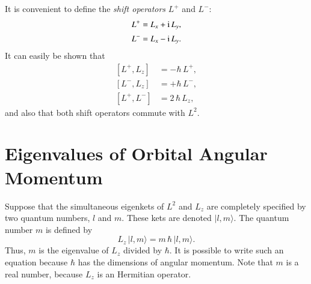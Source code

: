 It is convenient to define the {\em shift operators}\/ $L^+$ and $L^-$:
\begin{align}
L^+ &= L_x + {\rm i}\, L_y,\\[0.5ex]
L^- &= L_x -{\rm i} \,L_y.
\end{align}
It can easily be shown that
\begin{align}\label{e5.13a}
[L^+, L_z ] &= -\hbar\,L^+,\\[0.5ex]
[L^-, L_z] &=+\hbar\,L^-,\\[0.5ex]
[L^+, L^-] &= 2\,\hbar\,L_z,
\end{align}
and also that both  shift operators commute with $L^2$. 

\section{Eigenvalues of Orbital Angular Momentum}\label{s5.2}
Suppose that the simultaneous eigenkets of $L^2$ and $L_z$ are completely
specified by two quantum numbers, $l$ and $m$. These  kets are denoted
$|l, m\rangle$. The quantum number $m$ is defined by
\begin{equation}
L_z \,|l, m\rangle = m\,\hbar\, |l, m\rangle.
\end{equation}
Thus, $m$ is the eigenvalue of $L_z$ divided by $\hbar$. It is possible
to write such an equation because $\hbar$ has the dimensions of angular momentum.
Note that $m$ is a real number, because  $L_z$ is an Hermitian operator. 

